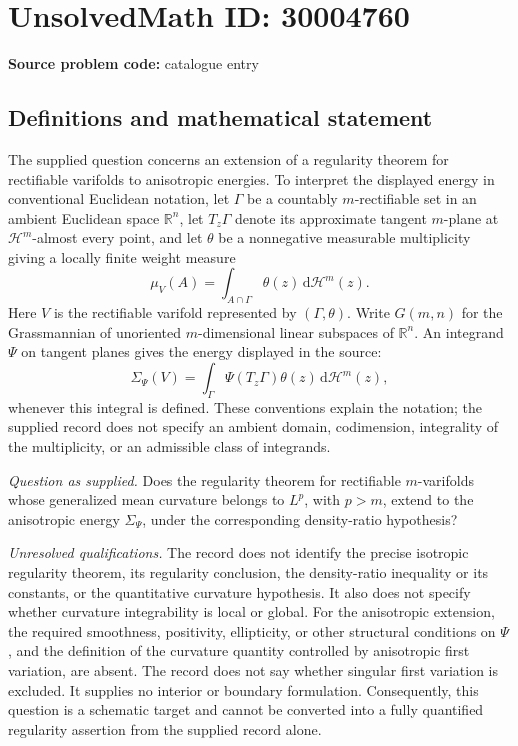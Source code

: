 \documentclass[11pt]{article}
\newcommand{\R}{\mathbb{R}}
\begin{document}
\section*{UnsolvedMath ID: 30004760}
\textbf{Source problem code:} catalogue entry
\subsection{Definitions and mathematical statement}
The supplied question concerns an extension of a regularity theorem for rectifiable varifolds to anisotropic energies. To interpret the displayed energy in conventional Euclidean notation, let \(\Gamma\) be a countably \(m\)-rectifiable set in an ambient Euclidean space \(\R^n\), let \(T_z\Gamma\) denote its approximate tangent \(m\)-plane at \(\mathcal H^m\)-almost every point, and let \(\theta\) be a nonnegative measurable multiplicity giving a locally finite weight measure
\[
\mu_V(A)=\int_{A\cap\Gamma}\theta(z)\,\mathrm d\mathcal H^m(z).
\]
Here \(V\) is the rectifiable varifold represented by \((\Gamma,\theta)\). Write \(G(m,n)\) for the Grassmannian of unoriented \(m\)-dimensional linear subspaces of \(\R^n\). An integrand \(\Psi\) on tangent planes gives the energy displayed in the source:
\[
\Sigma_\Psi(V)=\int_\Gamma\Psi(T_z\Gamma)\theta(z)\,\mathrm d\mathcal H^m(z),
\]
whenever this integral is defined. These conventions explain the notation; the supplied record does not specify an ambient domain, codimension, integrality of the multiplicity, or an admissible class of integrands.

\emph{Question as supplied.} Does the regularity theorem for rectifiable \(m\)-varifolds whose generalized mean curvature belongs to \(L^p\), with \(p>m\), extend to the anisotropic energy \(\Sigma_\Psi\), under the corresponding density-ratio hypothesis?

\emph{Unresolved qualifications.} The record does not identify the precise isotropic regularity theorem, its regularity conclusion, the density-ratio inequality or its constants, or the quantitative curvature hypothesis. It also does not specify whether curvature integrability is local or global. For the anisotropic extension, the required smoothness, positivity, ellipticity, or other structural conditions on \(\Psi\), and the definition of the curvature quantity controlled by anisotropic first variation, are absent. The record does not say whether singular first variation is excluded. It supplies no interior or boundary formulation. Consequently, this question is a schematic target and cannot be converted into a fully quantified regularity assertion from the supplied record alone.
\end{document}
